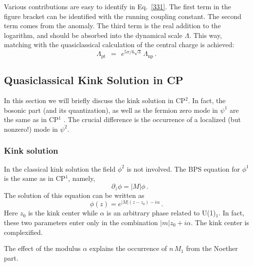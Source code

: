 \documentclass[epsfig,12pt]{article}
\def\beq{\begin{equation}}
\def\eeq{\end{equation}}
\def\beq{\begin{equation}}
\def\eeq{\end{equation}}
\begin{document}
	Various contributions are easy to identify in Eq.~\eqref{331}.
	The first term in the figure bracket can be identified with the running coupling constant.
	The second term comes from the anomaly.
	The third term is the real addition to the logarithm, and should be absorbed into the dynamical scale $\Lambda$.
	This way, matching with the quasiclassical calculation of the central charge is achieved:
\beq
	\Lambda_\text{pt} ~~=~~ e^{5 \pi / 6 \sqrt{3}}\, \Lambda_\text{np}\,.
\eeq

\subsection{Quasiclassical Kink Solution in CP}
\setcounter{equation}{0}
\label{kinksolu}

	In this section we will briefly discuss the kink solution in CP$^2$. 
	In fact, the bosonic part (and its quantization), 
	as well as the fermion zero mode in $\psi^1$ are the same as in CP$^1$ \cite{Shifman:2007ce}. 
	The crucial difference is the occurrence of a localized (but nonzero!) mode in $\psi^2$.


\subsubsection{Kink solution}

	In the classical kink solution the field $\phi^2$ is not involved. 
	The BPS equation for $\phi^1$ is the same as in CP$^1$, namely,
\beq
\quad \partial_z \phi = |M| \phi\,.
\label{13twentysix}
\eeq
	The solution of this equation  can be written as
\beq
\phi (z) = e^{|M|(z-z_0) -i\alpha}\,.
\label{13twentyseven}
\eeq
	Here $z_0$ is the kink center while $\alpha$ is an arbitrary phase related to U(1)$_1$.
	In fact, these two parameters enter only in the combination
	$|m| z_0 +i\alpha$. The kink center is complexified. 

	The effect of the modulus $\alpha$ explains the occurrence of 
	$n\,M_1$ from the Noether part.



\end{document}
